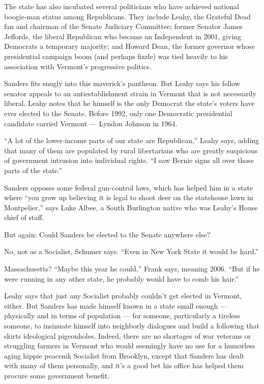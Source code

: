 The state has also incubated several politicians who have achieved
national boogie-man status among Republicans. They include Leahy, the
Grateful Dead fan and chairman of the Senate Judiciary Committee; former
Senator James Jeffords, the liberal Republican who became an Independent
in 2001, giving Democrats a temporary majority; and Howard Dean, the
former governor whose presidential campaign boom (and perhaps fizzle)
was tied heavily to his association with Vermont's progressive politics.

Sanders fits snugly into this maverick's pantheon. But Leahy says his
fellow senator appeals to an antiestablishment strain in Vermont that is
not necessarily liberal. Leahy notes that he himself is the only
Democrat the state's voters have ever elected to the Senate. Before
1992, only one Democratic presidential candidate carried Vermont ---
Lyndon Johnson in 1964.

``A lot of the lower-income parts of our state are Republican,'' Leahy
says, adding that many of them are populated by rural libertarians who
are greatly suspicious of government intrusion into individual rights.
``I saw Bernie signs all over those parts of the state.''

Sanders opposes some federal gun-control laws, which has helped him in a
state where ``you grow up believing it is legal to shoot deer on the
statehouse lawn in Montpelier,'' says Luke Albee, a South Burlington
native who was Leahy's House chief of staff.

But again: Could Sanders be elected to the Senate anywhere else?

No, not as a Socialist, Schumer says. ``Even in New York State it would
be hard.''

Massachusetts? ``Maybe this year he could,'' Frank says, meaning 2006.
``But if he were running in any other state, he probably would have to
comb his hair.''

Leahy says that just any Socialist probably couldn't get elected in
Vermont, either. But Sanders has made himself known in a state small
enough --- physically and in terms of population --- for someone,
particularly a tireless someone, to insinuate himself into neighborly
dialogues and build a following that skirts ideological pigeonholes.
Indeed, there are no shortages of war veterans or struggling farmers in
Vermont who would seemingly have no use for a humorless aging hippie
peacenik Socialist from Brooklyn, except that Sanders has dealt with
many of them personally, and it's a good bet his office has helped them
procure some government benefit.

